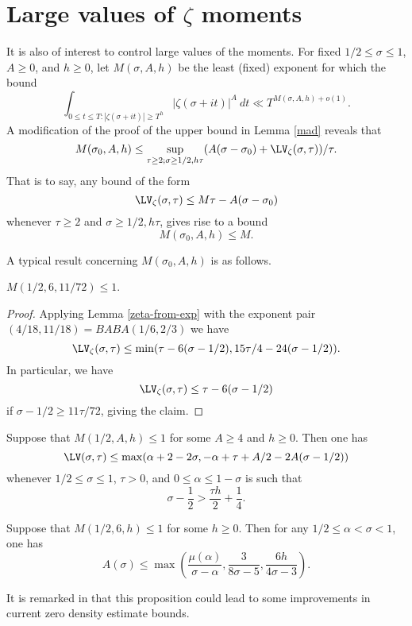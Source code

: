 \section{Large values of \texorpdfstring{$\zeta$}{zeta} moments}

It is also of interest to control large values of the moments.  For fixed $1/2 \leq \sigma \leq 1$, $A \geq 0$, and $h \geq 0$, let $M(\sigma,A,h)$ be the least (fixed) exponent for which the bound
$$ \int_{0 \leq t \leq T: |\zeta(\sigma+it)| \geq T^h} |\zeta(\sigma+it)|^A\ dt \ll T^{M(\sigma,A,h)+o(1)}.$$
A modification of the proof of the upper bound in Lemma \ref{mad} reveals that
\begin{equation}\label{msah}
    M(\sigma_0,A,h) \leq \sup_{\tau \geq 2; \sigma \geq 1/2, h\tau} (A(\sigma-\sigma_0) + \LV_\zeta(\sigma,\tau))/\tau.
\end{equation}
That is to say, any bound of the form
$$ \LV_\zeta(\sigma,\tau) \leq M \tau - A (\sigma - \sigma_0)$$
whenever $\tau \geq 2$ and $\sigma \geq 1/2, h\tau$, gives rise to a bound
$$ M(\sigma_0,A,h) \leq M.$$

A typical result concerning $M(\sigma_0,A,h)$ is as follows.

\begin{lemma}\cite[(8.56)]{ivic} $M(1/2, 6, 11/72) \leq 1$.
\end{lemma}

\begin{proof} Applying Lemma \ref{zeta-from-exp} with the exponent pair $(4/18, 11/18) = BABA(1/6, 2/3)$ we have
$$  \LV_\zeta(\sigma,\tau) \leq \min( \tau - 6(\sigma-1/2), 15\tau/4 - 24 (\sigma-1/2) ).$$
In particular, we have
$$ \LV_\zeta(\sigma,\tau) \leq \tau - 6(\sigma-1/2)$$
if $\sigma - 1/2 \geq 11 \tau/72$, giving the claim.
\end{proof}

\begin{lemma}\cite[Proposition 2]{bourgain_remarks_1995} Suppose that $M(1/2,A,h) \leq 1$ for some $A \geq 4$ and $h \geq 0$.  Then one has
    $$ \LV(\sigma,\tau) \leq \max( \alpha + 2 - 2 \sigma, -\alpha + \tau + A/2 - 2A (\sigma-1/2))$$
whenever $1/2 \leq \sigma \leq 1$, $\tau > 0$, and $0 \leq \alpha \leq 1-\sigma$ is such that
$$ \sigma - \frac{1}{2} > \frac{\tau h}{2} + \frac{1}{4}.$$
\end{lemma}

\begin{lemma} \cite[Proposition 5]{bourgain_remarks_1995}  Suppose that $M(1/2,6,h) \leq 1$ for some $h \geq 0$.  Then for any $1/2 \leq \alpha < \sigma < 1$, one has
$$ A(\sigma) \leq \max( \frac{\mu(\alpha)}{\sigma-\alpha}, \frac{3}{8\sigma-5}, \frac{6h}{4\sigma-3}).$$
\end{lemma}

It is remarked in \cite{bourgain_remarks_1995} that this proposition could lead to some improvements in current zero density estimate bounds.